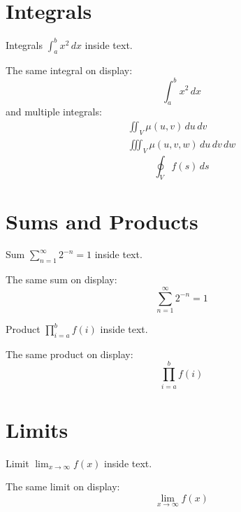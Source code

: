 \documentclass{article}
\title{}
\author{}
\date{17 April 2023}
\begin{document}
\maketitle

\section{Integrals}
Integrals $\int_{a}^{b} x^2\,dx$ inside text.

The same integral on display:
\[\int_{a}^{b} x^2\,dx\]
and multiple integrals:
\begin{align*}
    \iint_V \mu(u,v)\,du\,dv \\
    \iiint_V \mu(u,v,w)\,du\,dv\,dw
\end{align*}
\[
\oint_V f(s) \,ds
\]

\section{Sums and Products}
Sum $\sum_{n=1}^{\infty} 2^{-n} = 1$ inside text.

The same sum on display:
\[\sum_{n=1}^{\infty} 2^{-n} = 1\]

Product $\prod_{i=a}^{b} f(i)$ inside text.

The same product on display:
\[\prod_{i=a}^{b} f(i)\]

\section{Limits}
Limit $\lim_{x\to\infty} f(x)$ inside text.

The same limit on display:
\[\lim_{x\to\infty} f(x)\]
\end{document}
